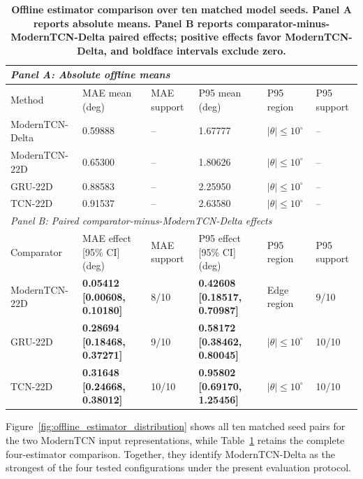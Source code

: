 \documentclass{ieeeaccess}
\begin{document}
\begin{table}[!tbp]
\centering
\caption{\textbf{Offline estimator comparison over ten matched model seeds. Panel A reports absolute means. Panel B reports comparator-minus-ModernTCN-Delta paired effects; positive effects favor ModernTCN-Delta, and boldface intervals exclude zero.}}
\label{tab:estimator_and_delta_results}
\scriptsize
\setlength{\tabcolsep}{2.6pt}
\begin{tabular}{|p{}|p{}|p{}|p{}|p{}|p{}|}
\hline
\multicolumn{6}{|l|}{\textit{Panel A: Absolute offline means}} \\
\hline
Method & MAE mean (deg) & MAE support & P95 mean (deg) & P95 region & P95 support \\
\hline
ModernTCN-Delta & 0.59888 & -- & 1.67777 & $|\theta|\leq10^{\circ}$ & -- \\
ModernTCN-22D & 0.65300 & -- & 1.80626 & $|\theta|\leq10^{\circ}$ & -- \\
GRU-22D & 0.88583 & -- & 2.25950 & $|\theta|\leq10^{\circ}$ & -- \\
TCN-22D & 0.91537 & -- & 2.63580 & $|\theta|\leq10^{\circ}$ & -- \\
\hline
\multicolumn{6}{|l|}{\textit{Panel B: Paired comparator-minus-ModernTCN-Delta effects}} \\
\hline
Comparator & MAE effect [95\% CI] (deg) & MAE support & P95 effect [95\% CI] (deg) & P95 region & P95 support \\
\hline
ModernTCN-22D & \textbf{0.05412 [0.00608, 0.10180]} & 8/10 & \textbf{0.42608 [0.18517, 0.70987]} & Edge region & 9/10 \\
GRU-22D & \textbf{0.28694 [0.18468, 0.37271]} & 9/10 & \textbf{0.58172 [0.38462, 0.80045]} & $|\theta|\leq10^{\circ}$ & 10/10 \\
TCN-22D & \textbf{0.31648 [0.24668, 0.38012]} & 10/10 & \textbf{0.95802 [0.69170, 1.25456]} & $|\theta|\leq10^{\circ}$ & 10/10 \\
\hline
\end{tabular}
\end{table}

Figure~\ref{fig:offline_estimator_distribution} shows all ten matched seed pairs for the two ModernTCN input representations, while Table~\ref{tab:estimator_and_delta_results} retains the complete four-estimator comparison. Together, they identify ModernTCN-Delta as the strongest of the four tested configurations under the present evaluation protocol.
\end{document}
